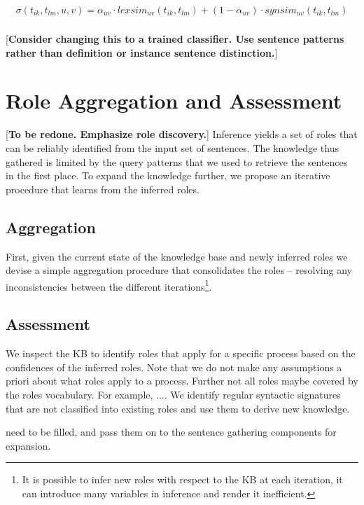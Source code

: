 \begin{align*}
\sigma(t_{ik}, t_{lm}, u, v)	= \alpha_{uv} \cdot lexsim_{uv}(t_{ik}, t_{lm}) + (1 - \alpha_{uv}) \cdot synsim_{uv}(t_{ik}, t_{lm})\\
\end{align*}

[{\bf Consider changing this to a trained classifier. Use sentence patterns rather than definition or instance sentence distinction.}]

\section{Role Aggregation and Assessment}
[{\bf To be redone. Emphasize role discovery.}]
Inference yields a set of roles that can be reliably identified from the input set of sentences. 
The knowledge thus gathered is limited by the query patterns that we used to retrieve the sentences in the first place. To expand the knowledge further, we propose an iterative procedure that learns from the inferred roles. 

\subsection{Aggregation}
First, given the current state of the knowledge base and newly inferred roles we devise a simple aggregation procedure that consolidates the roles -- resolving any inconsistencies between the different iterations\footnote{
It is possible to infer new roles with respect to the KB at each iteration, it can introduce many variables 
in inference and render it inefficient.
}.

\subsection{Assessment}

We inspect the KB to identify roles that apply for a specific process based on the confidences of the inferred roles. 
Note that we do not make any assumptions a priori about what roles apply to a process. 
Further not all roles maybe covered by the roles vocabulary. For example, ....
We identify regular syntactic signatures that are not classified into existing roles and use them to derive new knowledge.


need to be filled, and pass them on to the sentence gathering components for expansion.






